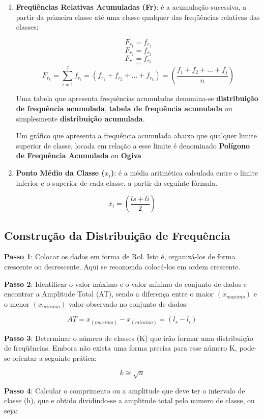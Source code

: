 \begin{enumerate}
\item \textbf{Freqüências Relativas Acumuladas (Fr)}: é a acumulação sucessiva, a partir da primeira classe até uma classe qualquer das freqüências relativas das classes;

$$ F_{r_{1}}=f_{r_{1}} $$
$$ F_{r_{2}}=f_{r_{2}} $$
$$ F_{r_{3}}=f_{r_{3}} $$
$$   \ldots  $$
$$ F_{r_{k}}=  \sum_{i=1}^{j}f_{r_{i}}  = (f_{r_{1}}+f_{r_{2}}+\ldots+ f_{r_{k}}) = \left( \frac{f_{1}+f_{2}+\ldots+f_{j}}{n} \right) $$

Uma tabela que apresenta frequências acumuladas denomina-se \textbf{distribuição de frequência acumulada}, \textbf{tabela de frequência acumulada} ou simplesmente \textbf{distribuição acumulada}.\vskip0.3cm

Um gráfico que apresenta a frequência acumulada abaixo que qualquer limite superior de classe, locada em relação a esse limite é denominado \textbf{Polígono de Frequência Acumulada} ou \textbf{Ogiva}

\item \textbf{Ponto Médio da Classe ($x_{i}$)}: é a média aritmética calculada entre o limite inferior e o superior de cada classe, a partir da seguinte fórmula.
\end{enumerate}

$$ x_{i} = \left( \frac{ls+li}{2} \right)$$


\newpage
\subsection{Construção da Distribuição de Frequência}

\textbf{Passo 1}: Colocar os dados em forma de Rol. Isto é, organizá-los de forma crescente ou decrescente. Aqui se recomenda colocá-los em ordem crescente.\vskip0.3cm

\textbf{Passo 2}: Identificar o valor máximo e o valor mínimo do conjunto de dados e encontrar a Amplitude Total (AT), sendo a diferença entre o maior $(x_{maximo})$ e o menor $(x_{minimo})$  valor observado no conjunto de dados:

$$ AT= x_{(maximo)}- x_{(minimo)} = (l_{s} - l_{i})$$

\textbf{Passo 3}: Determinar o número de classes (K) que irão formar uma distribuição de freqüências. Embora não exista uma forma precisa para esse número K, pode-se orientar a seguinte prática:

$$ k \cong \sqrt{n}$$

\textbf{Passo 4}: Calcular o comprimento ou a amplitude que deve ter o intervalo de classe (h), que e obtido dividindo-se a amplitude total pelo numero de classe, ou seja:

